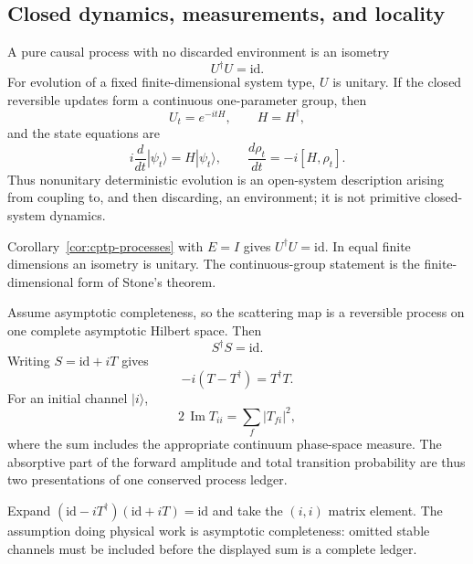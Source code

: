 \subsection{Closed dynamics, measurements, and locality}

\begin{theorem}
\label{thm:closed-unitary}
A pure causal process with no discarded environment is an isometry
\[
 U^\dagger U=\mathrm{id}.
\]
For evolution of a fixed finite-dimensional system type, \(U\) is unitary.  If the
closed reversible updates form a continuous one-parameter group, then
\[
 U_t=e^{-itH},
 \qquad H=H^\dagger,
\]
and the state equations are
\[
 i\frac{d}{dt}|\psi_t\rangle=H|\psi_t\rangle,
 \qquad
 \frac{d\rho_t}{dt}=-i[H,\rho_t].
\]
Thus nonunitary deterministic evolution is an open-system description arising from
coupling to, and then discarding, an environment; it is not primitive closed-system
dynamics.
\end{theorem}

\begin{proofsketch}
Corollary~\ref{cor:cptp-processes} with \(E=I\) gives
\(U^\dagger U=\mathrm{id}\).  In equal finite dimensions an isometry is unitary.
The continuous-group statement is the finite-dimensional form of Stone's theorem.
\end{proofsketch}


\begin{corollary}
\label{cor:optical-theorem-ledger}
Assume asymptotic completeness, so the scattering map is a reversible process on
one complete asymptotic Hilbert space.  Then
\[
 S^\dagger S=\mathrm{id}.
\]
Writing \(S=\mathrm{id}+iT\) gives
\[
 \boxed{-i(T-T^\dagger)=T^\dagger T.}
\]
For an initial channel \(\lvert i\rangle\),
\[
 \boxed{
 2\,\operatorname{Im}T_{ii}
 =\sum_f\lvert T_{fi}\rvert^2,}
\]
where the sum includes the appropriate continuum phase-space measure.  The
absorptive part of the forward amplitude and total transition probability are thus
two presentations of one conserved process ledger.
\end{corollary}

\begin{proofsketch}
Expand \((\mathrm{id}-iT^\dagger)(\mathrm{id}+iT)=\mathrm{id}\) and take the
\((i,i)\) matrix element.  The assumption doing physical work is asymptotic
completeness: omitted stable channels must be included before the displayed sum is a
complete ledger.
\end{proofsketch}

